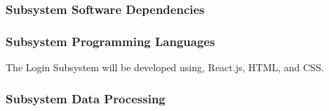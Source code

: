 \subsubsection{Subsystem Software Dependencies}

\subsubsection{Subsystem Programming Languages}
The Login Subsystem will be developed using, React.js, HTML, and CSS.

\subsubsection{Subsystem Data Processing}



